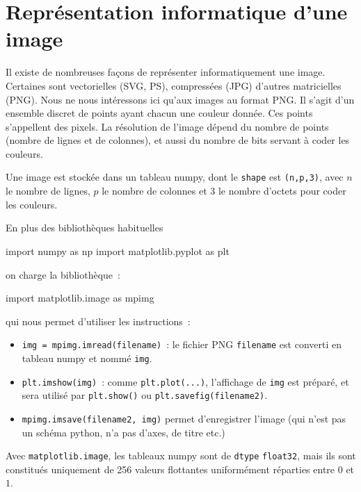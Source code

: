 \section{Représentation informatique d'une image}

Il existe de nombreuses façons de représenter informatiquement une
image. Certaines sont vectorielles (SVG, PS), compressées (JPG) d'autres
matricielles (PNG). Nous ne nous intéressons ici qu'aux images au
format PNG. Il s'agit d'un ensemble
discret de points ayant chacun une couleur donnée. Ces points
s'appellent des pixels. La résolution de
l'image dépend du nombre de points (nombre de lignes et de colonnes),
et aussi du nombre de bits servant à coder les couleurs.

Une image est stockée dans un tableau numpy, dont le
\texttt{shape} est \texttt{(n,p,3)}, avec $n$ le nombre de lignes, $p$
le nombre de colonnes et $3$ le nombre d'octets pour coder les
couleurs. 


En plus des bibliothèques habituelles
\begin{python}
import numpy as np
import matplotlib.pyplot as plt
\end{python}
on charge la bibliothèque~:
\begin{python}
import matplotlib.image as mpimg
\end{python}
qui nous permet d'utiliser les instructions~: 
\begin{itemize}
\item 
  \verb#img = mpimg.imread(filename)#~: le fichier PNG \verb#filename#
  est converti en tableau numpy et nommé \verb#img#.
\item 
  \verb#plt.imshow(img)#~: comme \verb#plt.plot(...)#, l'affichage de
  \verb#img# est préparé, et sera utilisé par \verb#plt.show()# ou
  \verb#plt.savefig(filename2)#.
\item
  \verb#mpimg.imsave(filename2, img)# permet d'enregistrer l'image
  (qui n'est pas un schéma python, n'a pas d'axes, de titre etc.)
\end{itemize}

\begin{remark}
  Avec \texttt{matplotlib.image}, les tableaux numpy sont de
  \texttt{dtype} \texttt{float32}, mais ils sont constitués uniquement
  de 256 valeurs flottantes uniformément réparties entre $0$ et $1$.
\end{remark}


